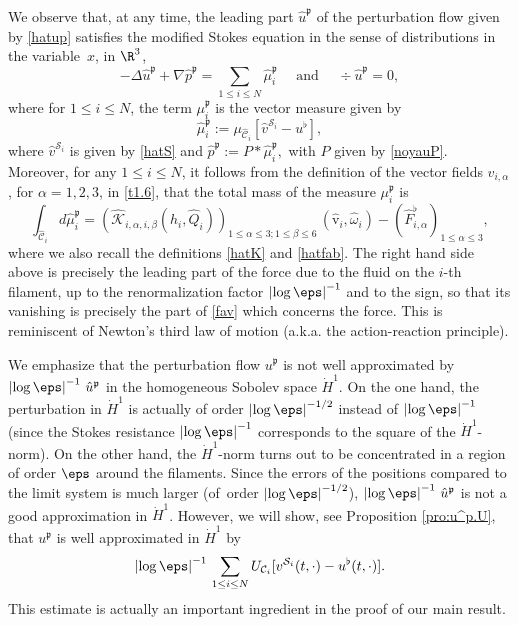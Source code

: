 We observe that, at any time, the leading part
${\hat u}^\mathfrak{p}$ of the perturbation flow given by
\eqref{hatup} satisfies the modified Stokes equation in the sense of distributions in
the variable~$x$, in $\R^3$,
\begin{equation*}
-\Delta {\hat u}^\mathfrak{p} + \nabla {\hat p}^\mathfrak{p} = \sum_{1 \leq i \leq N} \hat \mu^\mathfrak{p}_i \quad \text{ and } \quad \div {\hat u}^\mathfrak{p} = 0,
\end{equation*}
where for $1 \leq i \leq N$, the term $\mu^\mathfrak{p}_i $ is the vector measure given by
\[
\hat \mu^\mathfrak{p}_i :=
\mu_{\hat{\mathcal C}_i}[{\hat v}^{{\mathcal S}_i} - u^\flat],
\]
where ${\hat v}^{{\mathcal S}_i} $ is given by \eqref{hatS}
and
${\hat p}^\mathfrak{p} := P \ast \hat \mu^\mathfrak{p}_i,$
with $ P $ given by \eqref{noyauP}.
Moreover, for any $1 \leq i \leq N$, it follows from the definition of
the vector fields $v_{i,\alpha}$, for $\alpha =1,2,3$, in \eqref{t1.6}, that the total mass of the measure $\mu^\mathfrak{p}_i $ is
\[
\int_{\hat{\mathcal C}_i} d \hat \mu^\mathfrak{p}_i
=
(\hat{\mathcal K}_{i,\alpha,i,\beta} (\hat h_i, \hat Q_i))_{1 \leq \alpha \leq 3 ; 1 \leq \beta \leq 6} \,
(\hat{\textrm{v}}_i,{\hat \omega}_i) - (\hat{F}^\flat_{i,\alpha})_{1 \leq \alpha\leq 3},
\]
where we also recall the definitions \eqref{hatK} and \eqref{hatfab}.
The right hand side above is precisely the leading part of the force due to the fluid on the $i$-th filament, up to the
renormalization factor $\left|\log \eps\right|^{-1}$ and to the sign, so that its vanishing is precisely the part of \eqref{fav} which concerns the force.
This is reminiscent of Newton's third law of motion (a.k.a. the action-reaction principle).

We emphasize that the perturbation flow ${u}^\mathfrak{p}$ is not well approximated by $\left|\log \eps\right|^{-1} \, {\hat u}^\mathfrak{p} $ in the homogeneous Sobolev space
$\dot H^1$.
On the one hand, the perturbation in $\dot H^1$ is actually of order $\left|\log \eps\right|^{-1/2}$ instead of $\left|\log \eps\right|^{-1}$ (since the Stokes resistance $\left|\log \eps\right|^{-1}$ corresponds to the square of the $\dot H^1$-norm).
On the other hand, the $\dot H^1$-norm turns out to be concentrated in a region of order $\eps$ around the filaments. Since the errors of the positions compared to the limit system is much larger (of~order $\left|\log \eps\right|^{-1/2}$), $\left|\log \eps\right|^{-1} \, {\hat u}^\mathfrak{p} $ is not a good approximation in $\dot H^1$.
However, we will show, see Proposition \ref{pro:u^p.U}, that ${u}^\mathfrak{p}$ is well approximated in $\dot H^1$ by
\begin{equation}
\left|\log \eps\right|^{-1} \, \sum_{1 \leq i \leq N} U_{\mathcal C_i} [v^{\mathcal S_i}(t,\cdot) - u^\flat(t,\cdot)].
\end{equation}
This estimate is actually an important ingredient in the proof of our main result.

